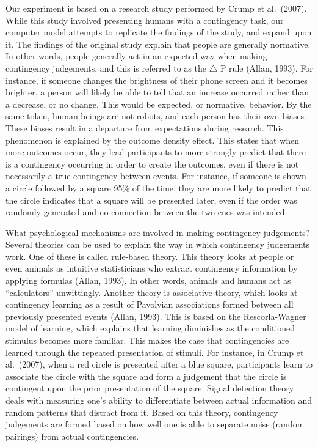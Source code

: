 \documentclass[
  english,
  man]{apa6}
\begin{document}
Our experiment is based on a research study performed by Crump et al.~(2007). While this study involved presenting humans with a contingency task, our computer model attempts to replicate the findings of the study, and expand upon it. The findings of the original study explain that people are generally normative. In other words, people generally act in an expected way when making contingency judgements, and this is referred to as the \(\triangle\) P rule (Allan, 1993). For instance, if someone changes the brightness of their phone screen and it becomes brighter, a person will likely be able to tell that an increase occurred rather than a decrease, or no change. This would be expected, or normative, behavior. By the same token, human beings are not robots, and each person has their own biases. These biases result in a departure from expectations during research. This phenomenon is explained by the outcome density effect. This states that when more outcomes occur, they lead participants to more strongly predict that there is a contingency occurring in order to create the outcomes, even if there is not necessarily a true contingency between events. For instance, if someone is shown a circle followed by a square 95\% of the time, they are more likely to predict that the circle indicates that a square will be presented later, even if the order was randomly generated and no connection between the two cues was intended.

What psychological mechanisms are involved in making contingency judgements? Several theories can be used to explain the way in which contingency judgements work. One of these is called rule-based theory. This theory looks at people or even animals as intuitive statisticians who extract contingency information by applying formulas (Allan, 1993). In other words, animals and humans act as \enquote{calculators} unwittingly. Another theory is associative theory, which looks at contingency learning as a result of Pavolvian associations formed between all previously presented events (Allan, 1993). This is based on the Rescorla-Wagner model of learning, which explains that learning diminishes as the conditioned stimulus becomes more familiar. This makes the case that contingencies are learned through the repeated presentation of stimuli. For instance, in Crump et al.~(2007), when a red circle is presented after a blue square, participants learn to associate the circle with the square and form a judgement that the circle is contingent upon the prior presentation of the square. Signal detection theory deals with measuring one's ability to differentiate between actual information and random patterns that distract from it. Based on this theory, contingency judgements are formed based on how well one is able to separate noise (random pairings) from actual contingencies.
\end{document}
